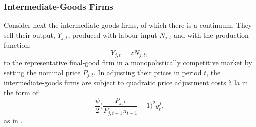 \documentclass[a4paper,12pt]{article} %
\numberwithin{equation}{section} %
\numberwithin{figure}{section}
\numberwithin{table}{section}
\begin{document}
\begin{refsection}
\begin{appendices}
\subsubsection*{Intermediate-Goods Firms}

Consider next the intermediate-goods firms, of which there is a continuum. They sell their output, $Y_{j,t}$, produced with labour input $N_{j,t}$ and with the production function:
\begin{equation}
    Y_{j,t} = z N_{j,t}, \label{eq:app-firms-input-production}
\end{equation}
to the representative final-good firm in a monopolistically competitive market by setting the nominal price $P_{j,t}$. In adjusting their prices in period $t$, the intermediate-goods firms are subject to quadratic price adjustment costs à la \textcite{rotemberg1982} in the form of:
\begin{equation}
    \frac{\psi}{2} \Bigg( \frac{P_{j,t}}{P_{j,t-1} \tilde{\pi}_{t-1}} - 1 \Bigg)^2 y_t^f, \label{eq:app-firms-price-adj}
\end{equation}
as in \textcite{gust2017wp}.


\end{appendices}
\end{refsection}
\end{document}

